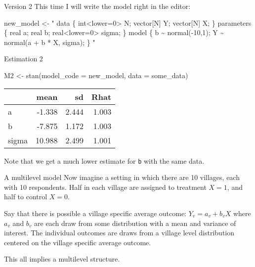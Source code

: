 \documentclass[
  11pt,
  ignorenonframetext,
]{beamer}
\newenvironment{Shaded}{\begin{snugshade}}{\end{snugshade}}
\newcommand{\AttributeTok}[1]{\textcolor[rgb]{0.40,0.45,0.13}{#1}}
\newcommand{\FunctionTok}[1]{\textcolor[rgb]{0.28,0.35,0.67}{#1}}
\newcommand{\NormalTok}[1]{\textcolor[rgb]{0.00,0.23,0.31}{#1}}
\newcommand{\OtherTok}[1]{\textcolor[rgb]{0.00,0.23,0.31}{#1}}
\newcommand{\StringTok}[1]{\textcolor[rgb]{0.13,0.47,0.30}{#1}}
\begin{document}
\begin{frame}[fragile]{Version 2}
\protect\hypertarget{version-2}{}
This time I will write the model right in the editor:

\begin{Shaded}
\begin{Highlighting}[]
\NormalTok{new\_model }\OtherTok{\textless{}{-}} \StringTok{"}
\StringTok{data \{}
\StringTok{  int\textless{}lower=0\textgreater{} N;}
\StringTok{  vector[N] Y;}
\StringTok{  vector[N] X;}
\StringTok{\}}
\StringTok{parameters \{}
\StringTok{  real a;}
\StringTok{  real b;}
\StringTok{  real\textless{}lower=0\textgreater{} sigma;}
\StringTok{\}}
\StringTok{model \{}
\StringTok{  b \textasciitilde{} normal({-}10,1);}
\StringTok{  Y \textasciitilde{} normal(a + b * X, sigma);}
\StringTok{\}}
\StringTok{"}
\end{Highlighting}
\end{Shaded}
\end{frame}

\begin{frame}[fragile]{Estimation 2}
\protect\hypertarget{estimation-2}{}
\begin{Shaded}
\begin{Highlighting}[]
\NormalTok{M2 }\OtherTok{\textless{}{-}} \FunctionTok{stan}\NormalTok{(}\AttributeTok{model\_code =}\NormalTok{ new\_model, }\AttributeTok{data =}\NormalTok{ some\_data)}
\end{Highlighting}
\end{Shaded}

\begin{tabular}{l|r|r|r}
\hline
  & mean & sd & Rhat\\
\hline
a & -1.338 & 2.444 & 1.003\\
\hline
b & -7.875 & 1.172 & 1.003\\
\hline
sigma & 10.988 & 2.499 & 1.001\\
\hline
\end{tabular}

Note that we get a much lower estimate for \texttt{b} with the same
data.
\end{frame}

\begin{frame}{A multilevel model}
\protect\hypertarget{a-multilevel-model}{}
Now imagine a setting in which there are 10 villages, each with 10
respondents. Half in each village are assigned to treatment \(X=1\), and
half to control \(X=0\).

Say that there is possible a village specific average outcome:
\(Y_v = a_v + b_vX\) where \(a_v\) and \(b_v\) are each draw from some
distribution with a mean and variance of interest. The individual
outcomes are draws from a village level distribution centered on the
village specific average outcome.

This all implies a multilevel structure.
\end{frame}
\end{document}
